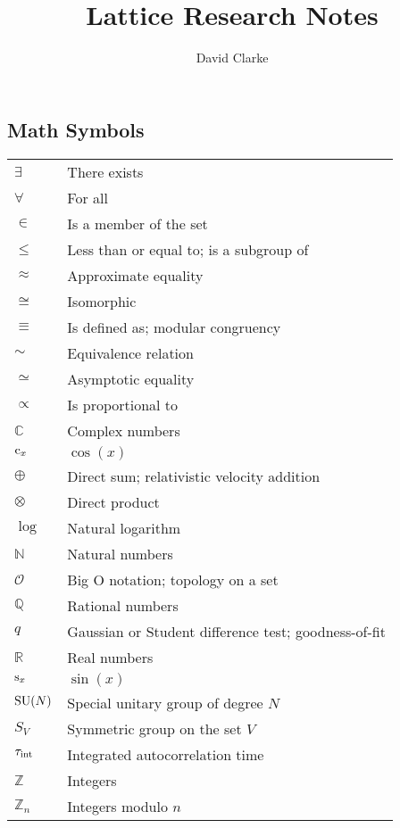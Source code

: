 \documentclass[12pt]{book}
\title{\bf Lattice Research Notes}
\author{David Clarke}
\theoremstyle{definition}
\newenvironment{frontstuff}
  {\centering\chapter*{}}
  {\clearpage}
\begin{document}
\frontmatter                            %
\maketitle                              %

\begin{frontstuff} %

\section*{Math Symbols}
\begin{tabular}{ll}
$\exists$       & There exists \\
$\forall$       & For all \\
$\in$           & Is a member of the set \\
$\leq$          & Less than or equal to; is a subgroup of\\
$\approx$       & Approximate equality \\
$\cong$         & Isomorphic\\
$\equiv$        & Is defined as; modular congruency \\
$\sim$          & Equivalence relation \\
$\simeq$        & Asymptotic equality \\
$\propto$       & Is proportional to \\
$\mathbb{C}$    & Complex numbers \\
$\operatorname{c}_x$         & $\cos(x)$ \\
$\oplus$        & Direct sum; relativistic velocity addition  \\
$\otimes$       & Direct product \\ 
$\log$          & Natural logarithm \\
$\mathbb{N}$    & Natural numbers \\
$\mathcal{O}$   & Big O notation; topology on a set \\ 
$\mathbb{Q}$    & Rational numbers \\
$q$             & Gaussian or Student difference test; goodness-of-fit \\
$\mathbb{R}$    & Real numbers \\
$\operatorname{s}_x$          & $\sin(x)$ \\
$\operatorname{SU}(N)$        & Special unitary group of degree $N$ \\
$S_V$           & Symmetric group on the set $V$ \\
$\tau_\text{int}$       & Integrated autocorrelation time \\
$\mathbb{Z}$    & Integers \\
$\mathbb{Z}_n$  & Integers modulo $n$ \\
\end{tabular}
\clearpage


\end{frontstuff}
\end{document}
